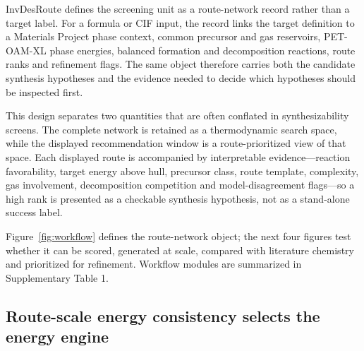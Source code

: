 \documentclass[11pt, letterpaper]{article}
\newcommand{\invdesroute}{InvDesRoute}
\begin{document}
\invdesroute{} defines the screening unit as a route-network record rather than a target label. For a formula or CIF input, the record links the target definition to a Materials Project phase context, common precursor and gas reservoirs, PET-OAM-XL phase energies, balanced formation and decomposition reactions, route ranks and refinement flags. The same object therefore carries both the candidate synthesis hypotheses and the evidence needed to decide which hypotheses should be inspected first.


This design separates two quantities that are often conflated in synthesizability screens. The complete network is retained as a thermodynamic search space, while the displayed recommendation window is a route-prioritized view of that space. Each displayed route is accompanied by interpretable evidence---reaction favorability, target energy above hull, precursor class, route template, complexity, gas involvement, decomposition competition and model-disagreement flags---so a high rank is presented as a checkable synthesis hypothesis, not as a stand-alone success label.



\noindent Figure~\ref{fig:workflow} defines the route-network object; the next four figures test whether it can be scored, generated at scale, compared with literature chemistry and prioritized for refinement. Workflow modules are summarized in Supplementary Table 1.

\subsection*{Route-scale energy consistency selects the energy engine}
\end{document}

